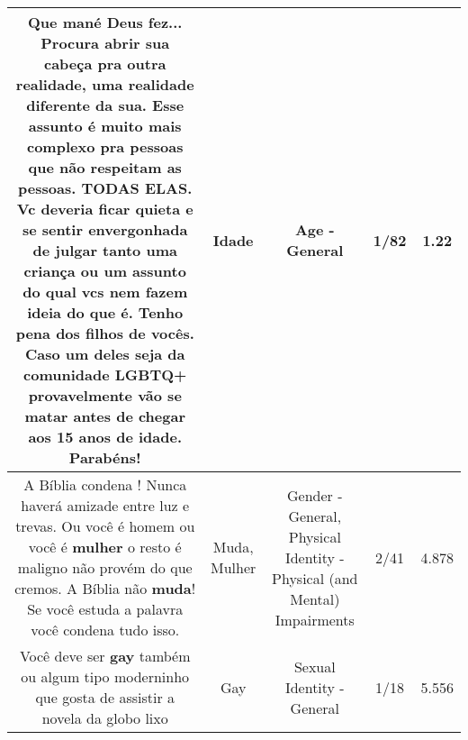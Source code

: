 \documentclass[11pt]{article}
\newlength\mylength
\begin{document}
\begin{center}
\begin{longtable}{|C{.65\mylength}|C{.30\mylength}|C{.12\mylength}|C{.12\mylength}|C{.12\mylength}|}
  \small Que mané Deus fez... Procura abrir sua cabeça pra outra realidade, uma realidade diferente da sua. Esse assunto é muito mais complexo pra pessoas que não respeitam as pessoas. TODAS ELAS. Vc deveria ficar quieta e se sentir envergonhada de julgar tanto uma criança ou um assunto do qual vcs nem fazem ideia do que é. Tenho pena dos filhos de vocês. Caso um deles seja da comunidade LGBTQ+ provavelmente vão se matar antes de chegar aos 15 anos de \textbf{idade}. Parabéns!\normalsize   & Idade & Age - General & 1/82 & 1.22 \\  \hline
  \small A Bíblia condena ! Nunca haverá amizade entre luz e trevas. Ou você é homem ou você é \textbf{mulher} o resto é maligno não provém do que cremos. A Bíblia não \textbf{muda}! Se você estuda a palavra você condena tudo isso.\normalsize   & Muda, Mulher & Gender - General, Physical Identity - Physical (and Mental) Impairments & 2/41 & 4.878 \\  \hline
  \small Você deve ser \textbf{gay} também ou algum tipo moderninho  que gosta de assistir a novela da globo lixo\normalsize   & Gay & Sexual Identity - General & 1/18 & 5.556 \\  \hline

\end{longtable}
\end{center}
\end{document}
